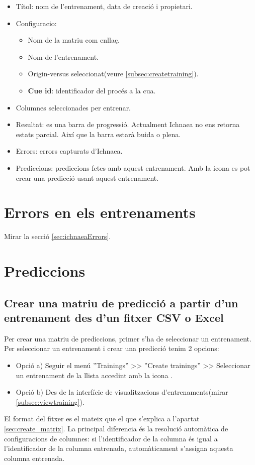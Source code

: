 \begin{itemize}
\item Títol: nom de l'entrenament, data de creació i propietari.
\item Configuracio: 
\begin{itemize}
\item Nom de la matriu com enllaç.
\item Nom de l'entrenament.
\item Origin-versus seleccionat(veure \ref{subsec:createtraining}).
\item \textbf{Cue id}: identificador del proc\'{e}s a la cua.
\end{itemize}
\item Columnes seleccionades per entrenar.
\item Resultat: es una barra de progressió. Actualment Ichnaea no ens retorna estats parcial. Així que la barra estarà buida o plena.
\item Errors: errors capturats d'Ichnaea.
\item Prediccions: prediccions fetes amb aquest entrenament. Amb la icona \iconadd es pot crear una predicció usant aquest entrenament.
\end{itemize}

\section{Errors en els entrenaments}
Mirar la secció \ref{sec:ichnaeaErrors}.

\section{Prediccions}
\subsection{Crear una matriu de predicció a partir d'un entrenament des d'un fitxer CSV o Excel}
Per crear una matriu de prediccions, primer s'ha de seleccionar un entrenament. Per seleccionar un entrenament i crear una predicció tenim 2 opcions:
\begin{itemize}
\item Opció a) Seguir el menú ''Trainings'' >> ''Create trainings'' >> Seleccionar un entrenament de la llista accedint amb la icona \icontableninesquares.
\item Opció b) Des de la interfície de visualitzacions d'entrenaments(mirar \ref{subsec:viewtraining}).
\end{itemize}
El format del fitxer es el mateix que el que s'explica a l'apartat \ref{sec:create_matrix}. La principal diferencia \'{e}s la resolució automàtica de configuracions de columnes: si l'identificador de la columna \'{e}s igual a l'identificador de la columna entrenada, automàticament s'assigna aquesta columna entrenada.

